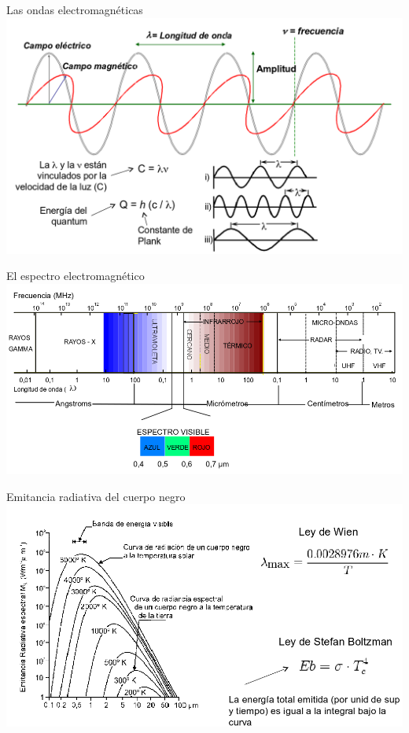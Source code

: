 \documentclass{beamer}
\begin{document}
\begin{frame}{Las ondas electromagnéticas}
	\includegraphics[width=\textwidth]{IMGs/ondas}
\end{frame}

\begin{frame}{El espectro electromagnético}
	\includegraphics[width=\textwidth]{IMGs/espectro}
\end{frame}

\begin{frame}{Emitancia radiativa del cuerpo negro}
	\includegraphics[width=\textwidth]{IMGs/law1}
\end{frame}
\end{document}
